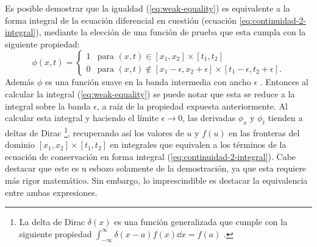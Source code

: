 Es posible demostrar que la igualdad (\ref{eq:weak-equality}) es equivalente a la forma integral de la ecuación diferencial en cuestión (ecuación \ref{eq:continuidad-2-integral}), mediante la elección de una función de prueba que esta cumpla con la siguiente propiedad:
\begin{equation}
	\phi(x,t) = 
	\begin{cases}
		1 & \text{para } (x,t) \in [x_1, x_2] \times [t_1, t_2]\\
		0 & \text{para } (x,t) \notin [x_1 - \epsilon, x_2 + \epsilon] \times [t_1 - \epsilon, t_2 + \epsilon].
 	\end{cases}
\end{equation}
Además $\phi$ es una función suave en la banda intermedia con ancho $\epsilon$ \cite{Leveque}. Entonces al calcular la integral (\ref{eq:weak-equality})  se puede notar que esta se reduce a la integral sobre la banda $\epsilon$, a raíz de la propiedad expuesta anteriormente. Al calcular esta integral y haciendo el límite $\epsilon \rightarrow 0$, las derivadas $\phi_x$ y $\phi_t$ tienden a deltas de Dirac \footnote{La delta de Dirac $\delta(x)$ es una función generalizada que cumple con la siguiente propiedad $\int_{-\infty}^{\infty} \delta(x-a) f(x)\dd{x} = f(a)$ \cite{methods}.}, recuperando así los valores de $u$ y $ f(u)$ en las fronteras del dominio $ [x_1, x_2] \times [t_1, t_2]$ en integrales que equivalen a los términos de la ecuación de conservación en forma integral (\ref{eq:continuidad-2-integral})\cite{Leveque}. Cabe destacar que este es u esbozo solamente de la demostración, ya que esta requiere más rigor matemático. Sin embargo, lo imprescindible es destacar la equivalencia entre ambas expresiones.
